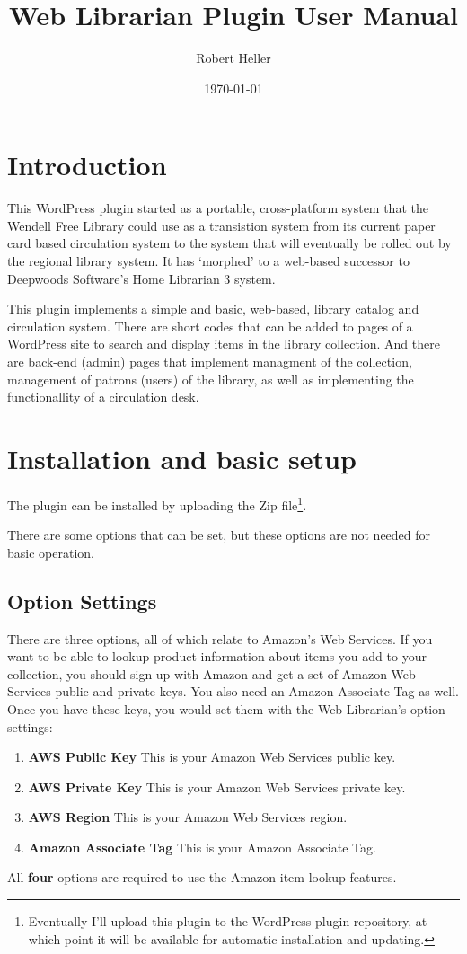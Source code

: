 \documentclass[letterpaper,twoside]{article}
\title{Web Librarian Plugin User Manual}
\author{Robert Heller}
\date{\today}
\begin{document}
\maketitle

\tableofcontents

\section{Introduction}

This WordPress plugin started as a portable, cross-platform system that
the Wendell Free Library could use as a transistion system from its current
paper card based circulation system to the system that will eventually
be rolled out by the regional library system.  It has `morphed' to a
web-based successor to Deepwoods Software's Home Librarian 3 system.

This plugin implements a simple and basic, web-based, library catalog
and circulation system.  There are short codes that can be added to
pages of a WordPress site to search and display items in the library
collection.  And there are back-end (admin) pages that implement
managment of the collection, management of patrons (users) of the
library, as well as implementing the functionallity of a  circulation
desk. 

\section{Installation and basic setup}

The plugin can be installed by uploading the Zip
file\footnote{Eventually I'll upload this plugin to the WordPress
plugin repository, at which point it will be available for automatic
installation and updating.}.

There are some options that can be set, but these options are not needed
for basic operation.  

\subsection{Option Settings}

There are three options, all of which relate to Amazon's Web Services.
If you want to be able to lookup product information about items you
add to your collection, you should sign up with Amazon and get a set of
Amazon Web Services public and private keys.  You also need an Amazon
Associate Tag as well. Once you have these keys, you would set them
with the Web Librarian's option settings:
\begin{enumerate}
\item \textbf{AWS Public Key} This is your Amazon Web Services public key.
\item \textbf{AWS Private Key} This is your Amazon Web Services private key.
\item \textbf{AWS Region} This is your Amazon Web Services region.
\item \textbf{Amazon Associate Tag} This is your Amazon Associate Tag.
\end{enumerate}
All \textbf{four} options are required to use the Amazon item lookup features.
\end{document}
